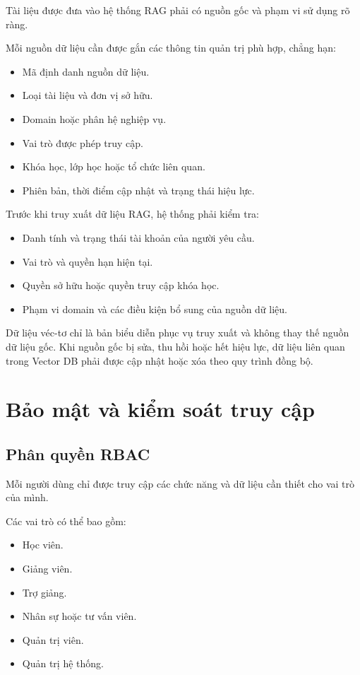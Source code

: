 \documentclass[12pt,a4paper]{article}
\begin{document}
Tài liệu được đưa vào hệ thống RAG phải có nguồn gốc và phạm vi sử dụng rõ ràng.

Mỗi nguồn dữ liệu cần được gắn các thông tin quản trị phù hợp, chẳng hạn:

\begin{itemize}
    \item Mã định danh nguồn dữ liệu.
    \item Loại tài liệu và đơn vị sở hữu.
    \item Domain hoặc phân hệ nghiệp vụ.
    \item Vai trò được phép truy cập.
    \item Khóa học, lớp học hoặc tổ chức liên quan.
    \item Phiên bản, thời điểm cập nhật và trạng thái hiệu lực.
\end{itemize}

Trước khi truy xuất dữ liệu RAG, hệ thống phải kiểm tra:

\begin{itemize}
    \item Danh tính và trạng thái tài khoản của người yêu cầu.
    \item Vai trò và quyền hạn hiện tại.
    \item Quyền sở hữu hoặc quyền truy cập khóa học.
    \item Phạm vi domain và các điều kiện bổ sung của nguồn dữ liệu.
\end{itemize}

Dữ liệu véc-tơ chỉ là bản biểu diễn phục vụ truy xuất và không thay thế nguồn dữ liệu gốc.
Khi nguồn gốc bị sửa, thu hồi hoặc hết hiệu lực, dữ liệu liên quan trong Vector DB
phải được cập nhật hoặc xóa theo quy trình đồng bộ.

\section{Bảo mật và kiểm soát truy cập}

\subsection{Phân quyền RBAC}

Mỗi người dùng chỉ được truy cập các chức năng và dữ liệu cần thiết cho vai trò của mình.

Các vai trò có thể bao gồm:

\begin{itemize}
    \item Học viên.
    \item Giảng viên.
    \item Trợ giảng.
    \item Nhân sự hoặc tư vấn viên.
    \item Quản trị viên.
    \item Quản trị hệ thống.
\end{itemize}
\end{document}
